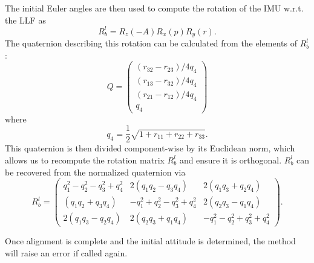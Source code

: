 \documentclass[11pt, oneside]{article}   	%
\begin{document}
The initial Euler angles are then used to compute the rotation of the IMU w.r.t. the LLF as
\begin{equation}
R_b^l=R_z(-A)R_x(p)R_y(r).
\end{equation}
The quaternion describing this rotation can be calculated from the elements of $R_b^l$:\begin{equation}
Q=\begin{pmatrix}
(r_{32}-r_{23})/4q_4 \\
(r_{13}-r_{32})/4q_4 \\
(r_{21}-r_{12})/4q_4 \\
q_4
\end{pmatrix}
\end{equation}
where
\begin{equation}
q_4=\frac12\sqrt{1+r_{11}+r_{22}+r_{33}}.
\end{equation}
This quaternion is then divided component-wise by its Euclidean norm, which allows us to recompute the rotation matrix $R_b^l$ and ensure it is orthogonal.  $R_b^l$ can be recovered from the normalized quaternion via
\begin{equation}
R_b^l=\begin{pmatrix}
q_1^2-q_2^2-q_3^2+q_4^2 & 2(q_1q_2-q_3q_4) & 2(q_1q_3+q_2q_4) \\
(q_1q_2+q_3q_4) & -q_1^2+q_2^2-q_3^2+q_4^2 & 2(q_2q_3-q_1q_4) \\
2(q_1q_3-q_2q_4) &  2(q_2q_3+q_1q_4) & -q_1^2-q_2^2+q_3^2+q_4^2
\end{pmatrix}.
\end{equation}

Once alignment is complete and the initial attitude is determined, the  method will raise an error if called again.
\end{document}

